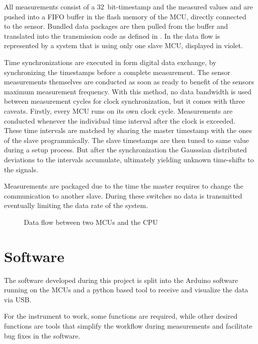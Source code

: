 All measurements consist of a \SI{32}{bit}-timestamp and the measured values and are pushed into a \ac{FIFO} buffer in the flash memory of the \ac{MCU}, directly connected to the sensor. Bundled data packages are then pulled from the buffer and translated into the transmission code as defined in . In  the data flow is represented by a system that is using only one slave \ac{MCU}, displayed in violet.

Time synchronizations are executed in form digital data exchange, by synchronizing the timestamps before a complete measurement. The sensor measurements themselves are conducted as soon as ready to benefit of the sensors maximum measurement frequency. With this method, no data bandwidth is used between measurement cycles for clock synchronization, but it comes with three caveats. Firstly, every \ac{MCU} runs on its own clock cycle. Measurements are conducted whenever the individual time interval after the clock is exceeded. These time intervals are matched by sharing the master timestamp with the ones of the slave programmically. The slave timestamps are then tuned to same value during a setup process. But after the synchronization the Gausssian distributed deviations to the intervals accumulate, ultimately yielding unknown time-shifts to the signals.

Measurements are packaged due to the time the master requires to change the communication to another slave. During these switches no data is transmitted eventually limiting the data rate of the system.

\begin{figure}[!htb]
  \centering
  
  \caption[Data flow]{Data flow between two \ac{MCU}s and the CPU%
    \label{fig:data_flow}}
\end{figure}

\section{Software}

The software developed during this project is split into the Arduino software running on the \acs{MCU}s and a python based tool to receive and visualize the data via \ac{USB}.

For the instrument to work, some functions are required, while other desired functions are tools that simplify the workflow during measurements and facilitate bug fixes in the software.

